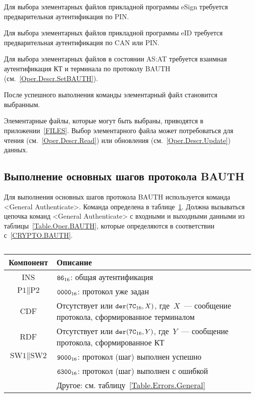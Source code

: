 Для выбора элементарных файлов прикладной программы eSign 
требуется предварительная аутентификация по PIN.

Для выбора элементарных файлов прикладной программы eID 
требуется предварительная аутентификация по CAN или PIN.

Для выбора элементарных файлов в состоянии AS:AT
требуется взаимная аутентификация КТ и терминала
по протоколу BAUTH (см.~\ref{Oper.Descr.SetBAUTH}).

После успешного выполнения команды элементарный файл становится выбранным.

Элементарные файлы, которые могут быть выбраны, 
приводятся в приложении~\ref{FILES}.  
Выбор элементарного файла может потребоваться для
чтения (см.~\ref{Oper.Descr.Read}) или 
обновления (см.~\ref{Oper.Descr.Update}) данных.

\subsection{Выполнение основных шагов протокола BAUTH}
\label{Oper.Descr.GABAUTH} 

Для выполнения основных шагов протокола BAUTH используется 
команда <General Authenticate>. 
Команда определена в таблице~\ref{Table.Oper.GABAUTHCmd}.
Должна вызываться цепочка команд <General Authenticate> 
с входными и выходными данными из таблицы~\ref{Table.Oper.BAUTH}, 
которые определяются в соответствии с~\ref{CRYPTO.BAUTH}. 

\begin{table}[H]
\caption{}\label{Table.Oper.GABAUTHCmd}
\begin{tabular}{|c|p{14cm}|}
\hline
Компонент & 	Описание \\
\hline
\hline
INS & $\texttt{86}_{16}$: общая аутентификация \\
\hline
$\text{P1} \parallel \text{P2}$ & $\texttt{0000}_{16}$: протокол уже задан\\ 
\hline
CDF & Отсутствует или $\texttt{der}(\texttt{7C}_{16}, X)$, 
где~$X$~--- сообщение протокола, сформированное терминалом\\
\hline 
RDF & Отсутствует или $\texttt{der}(\texttt{7C}_{16}, Y)$, где~$Y$~--- 
сообщение протокола, сформированное КТ\\
\hline
$\text{SW1} \parallel \text{SW2}$ 
  & $\texttt{9000}_{16}$: протокол (шаг) выполнен успешно \\
\cline{2-2}
  & $\texttt{6300}_{16}$: протокол (шаг) выполнен с ошибкой \\
\cline{2-2}
  & Другое: см. таблицу~\ref{Table.Errors.General} \\
\hline
\end{tabular}
\end{table}

